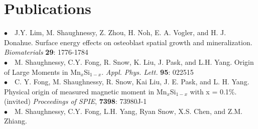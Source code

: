 \documentclass[11pt, a4paper]{article}
\newcommand{\years}[1]{\marginnote{\scriptsize #1}}
\begin{document}




\section*{{\color{mycolor4}Publications}}
\noindent
\years{2008}$\bullet$\ \   J.Y. Lim, M. Shaughnessy, Z. Zhou, H. Noh, E. A. Vogler, and H. J. Donahue.  %
{Surface energy effects on osteoblast spatial growth and mineralization.} \emph{Biomaterials} \textbf{29}: 1776-1784\\  
\years{2009}$\bullet$\ \   M. Shaughnessy, C.Y. Fong, R. Snow, K. Liu, J. Pask, and L.H. Yang. %
{ Origin of Large Moments in Mn$_x$Si$_{1-x}$.}\emph { Appl. Phys. Lett.} \textbf{95}: 022515\\
\years{    }$\bullet$\ \   C. Y. Fong, M. Shaughnessy, R. Snow, Kai Liu, J. E. Pask, and L. H. Yang. %
{Physical origin of measured magnetic moment in Mn$_x$Si$_{1-x}$ with x = 0.1\%.} (invited) \emph{Proceedings of SPIE}, \textbf{7398}: 73980J-1\\
\years{2010}$\bullet$\ \   M. Shaughnessy, C.Y. Fong, L.H. Yang, Ryan Snow, X.S. Chen, and Z.M. Zhiang. %
\end{document}
